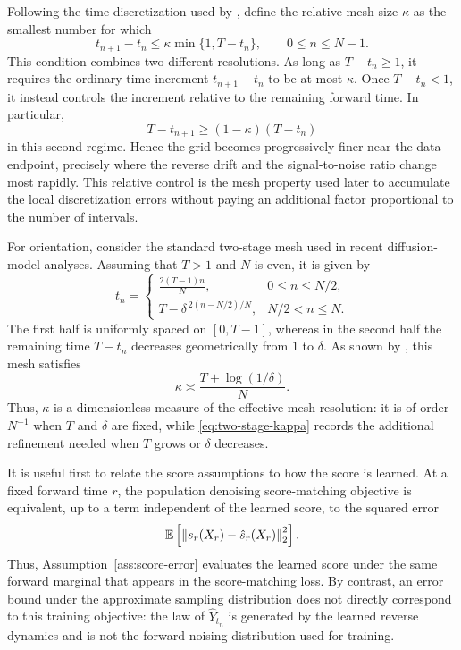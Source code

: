 \documentclass[11pt]{article}
\theoremstyle{definition}
\newcommand{\E}{\mathbb{E}}
\newcommand{\norm}[1]{\left\lVert #1\right\rVert_2}
\begin{document}
Following the time discretization used by
\citet{benton2024nearly}, define the relative mesh size $\kappa$ as
the smallest number for which
\begin{equation}
    t_{n+1}-t_n\le\kappa\min\{1,T-t_n\},
    \qquad 0\le n\le N-1.
    \label{eq:mesh-assumption}
\end{equation}
This condition combines two different resolutions. As long as
$T-t_n\ge1$, it requires the ordinary time increment
$t_{n+1}-t_n$ to be at most $\kappa$. Once $T-t_n<1$, it instead
controls the increment relative to the remaining forward time. In
particular,
\[
    T-t_{n+1}\ge(1-\kappa)(T-t_n)
\]
in this second regime. Hence the grid becomes progressively finer near
the data endpoint, precisely where the reverse drift and the
signal-to-noise ratio change most rapidly. This relative control is the
mesh property used later to accumulate the local discretization errors
without paying an additional factor proportional to the number of
intervals.

For orientation, consider the standard two-stage mesh used in recent
diffusion-model analyses. Assuming that $T>1$ and $N$ is even, it is
given by
\begin{equation}
    t_n=
    \begin{cases}
        \displaystyle \frac{2(T-1)n}{N},
        &0\le n\le N/2,\\[6pt]
        \displaystyle T-\delta^{\,2(n-N/2)/N},
        &N/2<n\le N.
    \end{cases}
    \label{eq:two-stage-mesh}
\end{equation}
The first half is uniformly spaced on $[0,T-1]$, whereas in the second
half the remaining time $T-t_n$ decreases geometrically from $1$ to
$\delta$. As shown by
\citet[Corollary~1]{benton2024nearly}, this mesh satisfies
\begin{equation}
    \kappa\asymp
    \frac{T+\log(1/\delta)}{N}.
    \label{eq:two-stage-kappa}
\end{equation}
Thus, $\kappa$ is a dimensionless measure of the effective mesh
resolution: it is of order $N^{-1}$ when $T$ and $\delta$ are fixed,
while \eqref{eq:two-stage-kappa} records the additional refinement
needed when $T$ grows or $\delta$ decreases.

It is useful first to relate the score assumptions to how the score is
learned. At a fixed forward time $r$, the population denoising
score-matching objective is equivalent, up to a term independent of
the learned score, to the squared error
\citep{song2021score}
\begin{align}
    \E\left[
        \norm{s_r(X_r)-\hat s_r(X_r)}^2
    \right].
    \notag
\end{align}
Thus, Assumption~\ref{ass:score-error} evaluates the learned score
under the same forward marginal that appears in the score-matching
loss. By contrast, an error bound under the approximate sampling
distribution does not directly correspond to this training objective:
the law of $\hat Y_{t_n}$ is generated by the learned reverse dynamics
and is not the forward noising distribution used for training.
\end{document}
